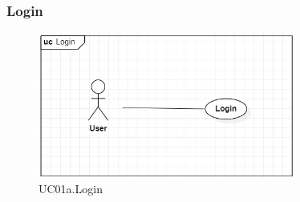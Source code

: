 \documentclass[../thesis.tex]{subfiles}
\begin{document}
\subsubsection{Login}
\begin{figure}[H]
    \centering
    \includegraphics[width=0.75\textwidth]{images/UCD_Login.png}
    \caption{UC01a.Login}
    \label{fig:UCD-login}
\end{figure}
\end{document}
